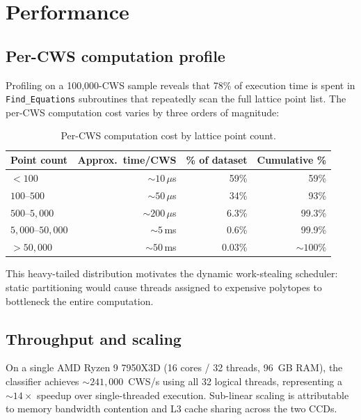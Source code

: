 \documentclass[12pt,a4paper]{article}
\theoremstyle{definition}
\begin{document}
\section{Performance}
\label{sec:performance}

\subsection{Per-CWS computation profile}

Profiling on a 100,000-CWS sample reveals that 78\% of execution time
is spent in \texttt{Find\_Equations} subroutines that repeatedly scan
the full lattice point list.  The per-CWS computation cost varies by
three orders of magnitude:

\begin{table}[h]
\centering
\caption{Per-CWS computation cost by lattice point count.}
\label{tab:cost}
\begin{tabular}{@{}lrrr@{}}
\toprule
Point count & Approx.\ time/CWS & \% of dataset & Cumulative \% \\
\midrule
$< 100$     & $\sim 10\,\mu$s   & 59\%   & 59\% \\
$100$--$500$  & $\sim 50\,\mu$s   & 34\%   & 93\% \\
$500$--$5{,}000$ & $\sim 200\,\mu$s & 6.3\%  & 99.3\% \\
$5{,}000$--$50{,}000$ & $\sim 5\,$ms & 0.6\%  & 99.9\% \\
$> 50{,}000$ & $\sim 50\,$ms     & 0.03\% & $\sim 100$\% \\
\bottomrule
\end{tabular}
\end{table}

This heavy-tailed distribution motivates the dynamic work-stealing
scheduler: static partitioning would cause threads assigned to expensive
polytopes to bottleneck the entire computation.

\subsection{Throughput and scaling}

On a single AMD Ryzen 9 7950X3D (16 cores / 32 threads, 96~GB RAM),
the classifier achieves $\sim 241{,}000$~CWS/s using all 32 logical
threads, representing a $\sim 14\times$ speedup over single-threaded
execution.  Sub-linear scaling is attributable to memory bandwidth
contention and L3 cache sharing across the two CCDs.
\end{document}
